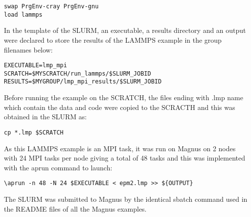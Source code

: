 \begin{tcolorbox}
\begin{Verbatim}[fontsize=\scriptsize]
swap PrgEnv-cray PrgEnv-gnu
load lammps
\end{Verbatim}
\end{tcolorbox}

In the template of the SLURM, an executable, a results directory and an output were declared to store the results of the LAMMPS example in the group filenames below:

\begin{tcolorbox}
\begin{Verbatim}[fontsize=\scriptsize]
EXECUTABLE=lmp_mpi
SCRATCH=$MYSCRATCH/run_lammps/$SLURM_JOBID
RESULTS=$MYGROUP/lmp_mpi_results/$SLURM_JOBID
\end{Verbatim}
\end{tcolorbox}

Before running the example on the SCRATCH, the files ending with .lmp name which contain the data and code were copied to the SCRACTH and this was
obtained in the SLURM as:

\begin{tcolorbox}
\begin{verbatim}
cp *.lmp $SCRATCH
\end{verbatim}
\end{tcolorbox}

As this LAMMPS example is an MPI task, it was run on Magnus on 2 nodes with 24 MPI tasks per node giving a total of 48 tasks and this was implemented
with the aprun command to launch:

\begin{tcolorbox}
\begin{Verbatim}[fontsize=\scriptsize]
\aprun -n 48 -N 24 $EXECUTABLE < epm2.lmp >> ${OUTPUT}
\end{Verbatim}
\end{tcolorbox}


The SLURM was submitted to Magnus by the identical sbatch command used in the README files of all the Magnus examples.


